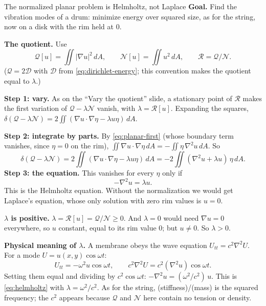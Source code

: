 \documentclass[11pt]{beamer}
\newcommand{\dd}{\,d}
\newcommand{\D}{\mathcal D}
\newcommand{\Q}{\mathcal Q}
\newcommand{\N}{\mathcal N}
\newcommand{\R}{\mathcal R}
\begin{document}
\begin{frame}[allowframebreaks=1.00]{The normalized planar problem is Helmholtz, not Laplace}
\small
\textbf{Goal.} Find the vibration modes of a drum: minimize energy over squared size, as for the string,
now on a disk with the rim held at \(0\).

\textbf{The quotient.} Use
\[
 \Q[u]=\iint|\nabla u|^2\dd A,\qquad
 \N[u]=\iint u^2\dd A,\qquad \R=\Q/\N .
\]
(\(\Q=2\D\) with \(\D\) from \eqref{eq:dirichlet-energy}; this convention makes the quotient equal to \(\lambda\).)

\textbf{Step 1: vary.} As on the ``Vary the quotient'' slide, a stationary point of \(\R\) makes the first
variation of \(\Q-\lambda\N\) vanish, with \(\lambda=\R[u]\). Expanding the squares,
\(\delta(\Q-\lambda\N)=2\iint(\nabla u\cdot\nabla\eta-\lambda u\eta)\dd A\).

\textbf{Step 2: integrate by parts.} By \eqref{eq:planar-first} (whose boundary term vanishes, since \(\eta=0\) on the rim),
\(\iint\nabla u\cdot\nabla\eta\dd A=-\iint\eta\,\nabla^2 u\dd A\). So
\[
 \delta(\Q-\lambda\N)
 =2\iint(\nabla u\cdot\nabla\eta-\lambda u\eta)\dd A
 =-2\iint(\nabla^2 u+\lambda u)\,\eta\dd A .
\]
\textbf{Step 3: the equation.} This vanishes for every \(\eta\) only if
\begin{equation}
 -\nabla^2 u=\lambda u.\label{eq:helmholtz}
\end{equation}
This is the Helmholtz equation. Without the normalization we would get Laplace's equation, whose only
solution with zero rim values is \(u=0\).

\textbf{\(\lambda\) is positive.} \(\lambda=\R[u]=\Q/\N\ge0\). And \(\lambda=0\) would need \(\nabla u=0\) everywhere, so \(u\) constant,
equal to its rim value \(0\); but \(u\ne0\). So \(\lambda>0\).

\textbf{Physical meaning of \(\lambda\).} A membrane obeys the wave equation \(U_{tt}=c^2\nabla^2 U\). For a mode
\(U=u(x,y)\cos\omega t\):
\[
 U_{tt}=-\omega^2u\cos\omega t,\qquad c^2\nabla^2 U=c^2(\nabla^2 u)\cos\omega t .
\]
Setting them equal and dividing by \(c^2\cos\omega t\): \(-\nabla^2 u=(\omega^2/c^2)\,u\). This is \eqref{eq:helmholtz} with
\(\lambda=\omega^2/c^2\). As for the string, (stiffness)/(mass) is the squared frequency; the \(c^2\) appears
because \(\Q\) and \(\N\) here contain no tension or density.
\end{frame}
\end{document}
